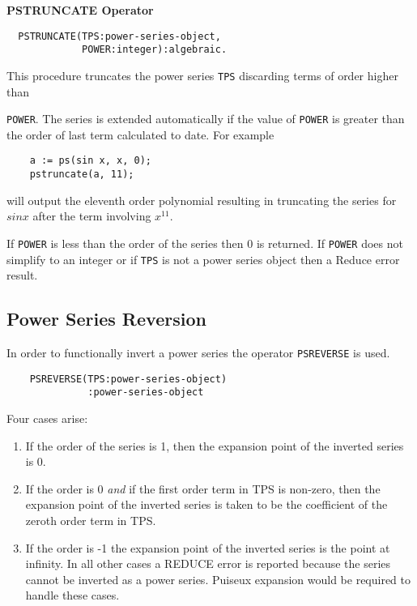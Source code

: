 \textbf{PSTRUNCATE Operator}
\hypertarget{operator:PSTRUNCATE}{}
\begin{verbatim}
  PSTRUNCATE(TPS:power-series-object,
             POWER:integer):algebraic.
\end{verbatim}
This procedure truncates the power series \texttt{TPS} discarding terms
of order higher than {\texttt{POWER}. The series is extended automatically
if the value of \texttt{POWER} is greater than the order of last term
calculated to date. For example
\begin{verbatim}
    a := ps(sin x, x, 0);
    pstruncate(a, 11);
\end{verbatim}
will output the eleventh order polynomial resulting in truncating the series
for $sin x$ after the term involving $x^{11}$.

If \texttt{POWER} is less than the order of the series then $0$ is
returned.  If \texttt{POWER} does not simplify to an integer or if
\texttt{TPS} is not a power series object then a Reduce error result.


\subsection{Power Series Reversion}
\hypertarget{operator:PSREVERSE}{}
In order to functionally invert a power series the operator \texttt{PSREVERSE}
is used. 
\begin{verbatim}
    PSREVERSE(TPS:power-series-object)
              :power-series-object
\end{verbatim}
Four cases arise:

\begin{enumerate}
\item If the order of the series is 1, then the expansion point of the
inverted series is 0.

\item If the order is 0 \emph{and} if the first order term in TPS
is non-zero, then the expansion point of the inverted series is taken
to be the coefficient of the zeroth order term in TPS.

\item If the order is -1 the expansion point of the inverted series
is the point at infinity.  In all other cases a REDUCE error is
reported because the series cannot be inverted as a power series.
Puiseux  expansion would be required to
handle these cases.


\end{enumerate}}
